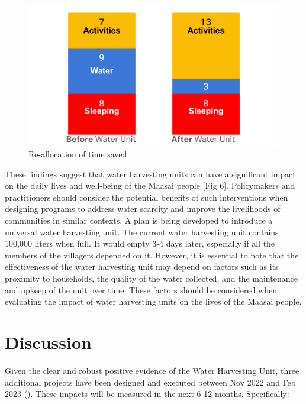 \documentclass[10pt, twocolumn]{article}
\begin{document}
\begin{figure} [H]
    \centering
    \includegraphics[width=1\linewidth]{photos/time_reallocation.png}
    \caption{Re-allocation of time saved}
    \label{fig:reallocation}
\end{figure}

These findings suggest that water harvesting units can have a significant impact on the daily lives and well-being of the Maasai people [Fig 6]. Policymakers and practitioners should consider the potential benefits of such interventions when designing programs to address water scarcity and improve the livelihoods of communities in similar contexts. A plan is being developed to introduce a universal water harvesting unit. The current water harvesting unit contains 100,000 liters when full. It would empty 3-4 days later, especially if all the members of the villagers depended on it. However, it is essential to note that the effectiveness of the water harvesting unit may depend on factors such as its proximity to households, the quality of the water collected, and the maintenance and upkeep of the unit over time. These factors should be considered when evaluating the impact of water harvesting units on the lives of the Maasai people.


















\section{Discussion}

Given the clear and robust positive evidence of the Water Harvesting Unit, three additional projects have been designed and executed between Nov 2022 and Feb 2023 (\autocite{Karimu}). These impacts will be measured in the next 6-12 months. Specifically:
\end{document}
